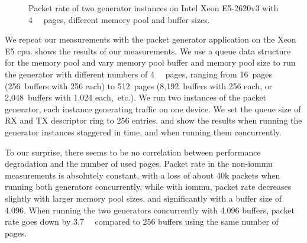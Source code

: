 \begin{figure}%
    \centering
    \par

    \caption{Packet rate of two generator instances on Intel Xeon E5-2620v3 with
    \SI{4}{\kibi\byte} pages, different memory pool and buffer sizes.}
    \label{fig:page-size-generator}
\end{figure}

We repeat our measurements with the packet generator application on the Xeon E5
\ac{cpu}.  shows the results of our measurements.
We use a queue data structure for the memory pool and vary memory pool buffer
and memory pool size to run the generator with different numbers of
\SI{4}{\kibi\byte} pages, ranging from 16~pages (256~buffers with
\SI{256}{\byte} each) to 512~pages (8,192~buffers with \SI{256}{\byte} each, or
2,048~buffers with \SI{1,024}{\byte} each,~etc.). We run two instances of the
packet generator, each instance generating traffic on one device. We set the
queue size of RX and TX descriptor ring to 256 entries.
 and
 show the results
when running the generator instances staggered in time,
 and
 when running them
concurrently.

To our surprise, there seems to be no correlation between performance
degradation and the number of used pages. Packet rate in the non-\ac{iommu}
measurements is absolutely constant, with a loss of about 40k packets when
running both generators concurrently, while with \ac{iommu}, packet rate
decreases slightly with larger memory pool sizes, and significantly with a
buffer size of \SI{4,096}{\byte}. When running the two generators concurrently
with \SI{4,096}{\byte} buffers, packet rate goes down by \SI{3.7}{\mega\pps}
compared to \SI{256}{\byte} buffers using the same number of pages.

